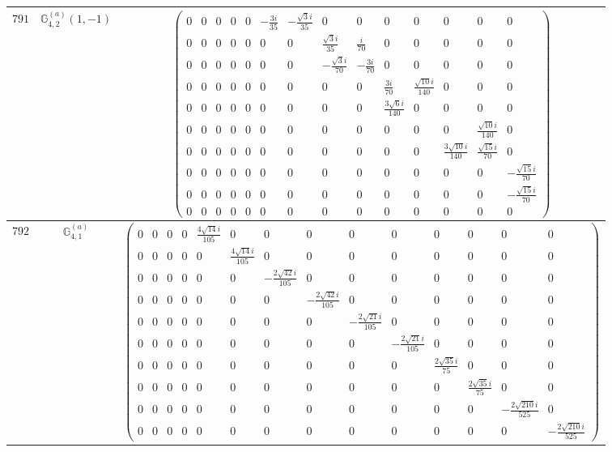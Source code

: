 \documentclass[fleqn,8pt,landscape]{jsarticle}
\begin{document}
\begin{center}
\begin{longtable}{ccc}
$ 791 $ & $ \mathbb{G}_{4,2}^{(a)}(1,-1) $ & $ \begin{pmatrix} 0 & 0 & 0 & 0 & 0 & - \frac{3 i}{35} & - \frac{\sqrt{3} i}{35} & 0 & 0 & 0 & 0 & 0 & 0 & 0 \\ 0 & 0 & 0 & 0 & 0 & 0 & 0 & \frac{\sqrt{3} i}{35} & \frac{i}{70} & 0 & 0 & 0 & 0 & 0 \\ 0 & 0 & 0 & 0 & 0 & 0 & 0 & - \frac{\sqrt{3} i}{70} & - \frac{3 i}{70} & 0 & 0 & 0 & 0 & 0 \\ 0 & 0 & 0 & 0 & 0 & 0 & 0 & 0 & 0 & \frac{3 i}{70} & \frac{\sqrt{10} i}{140} & 0 & 0 & 0 \\ 0 & 0 & 0 & 0 & 0 & 0 & 0 & 0 & 0 & \frac{3 \sqrt{6} i}{140} & 0 & 0 & 0 & 0 \\ 0 & 0 & 0 & 0 & 0 & 0 & 0 & 0 & 0 & 0 & 0 & 0 & \frac{\sqrt{10} i}{140} & 0 \\ 0 & 0 & 0 & 0 & 0 & 0 & 0 & 0 & 0 & 0 & 0 & \frac{3 \sqrt{10} i}{140} & \frac{\sqrt{15} i}{70} & 0 \\ 0 & 0 & 0 & 0 & 0 & 0 & 0 & 0 & 0 & 0 & 0 & 0 & 0 & - \frac{\sqrt{15} i}{70} \\ 0 & 0 & 0 & 0 & 0 & 0 & 0 & 0 & 0 & 0 & 0 & 0 & 0 & - \frac{\sqrt{15} i}{70} \\ 0 & 0 & 0 & 0 & 0 & 0 & 0 & 0 & 0 & 0 & 0 & 0 & 0 & 0 \end{pmatrix} $ \\ \hline
$ 792 $ & $ \mathbb{G}_{4,1}^{(a)} $ & $ \begin{pmatrix} 0 & 0 & 0 & 0 & \frac{4 \sqrt{14} i}{105} & 0 & 0 & 0 & 0 & 0 & 0 & 0 & 0 & 0 \\ 0 & 0 & 0 & 0 & 0 & \frac{4 \sqrt{14} i}{105} & 0 & 0 & 0 & 0 & 0 & 0 & 0 & 0 \\ 0 & 0 & 0 & 0 & 0 & 0 & - \frac{2 \sqrt{42} i}{105} & 0 & 0 & 0 & 0 & 0 & 0 & 0 \\ 0 & 0 & 0 & 0 & 0 & 0 & 0 & - \frac{2 \sqrt{42} i}{105} & 0 & 0 & 0 & 0 & 0 & 0 \\ 0 & 0 & 0 & 0 & 0 & 0 & 0 & 0 & - \frac{2 \sqrt{21} i}{105} & 0 & 0 & 0 & 0 & 0 \\ 0 & 0 & 0 & 0 & 0 & 0 & 0 & 0 & 0 & - \frac{2 \sqrt{21} i}{105} & 0 & 0 & 0 & 0 \\ 0 & 0 & 0 & 0 & 0 & 0 & 0 & 0 & 0 & 0 & \frac{2 \sqrt{35} i}{75} & 0 & 0 & 0 \\ 0 & 0 & 0 & 0 & 0 & 0 & 0 & 0 & 0 & 0 & 0 & \frac{2 \sqrt{35} i}{75} & 0 & 0 \\ 0 & 0 & 0 & 0 & 0 & 0 & 0 & 0 & 0 & 0 & 0 & 0 & - \frac{2 \sqrt{210} i}{525} & 0 \\ 0 & 0 & 0 & 0 & 0 & 0 & 0 & 0 & 0 & 0 & 0 & 0 & 0 & - \frac{2 \sqrt{210} i}{525} \end{pmatrix} $ \\ \hline

\end{longtable}
\end{center}
\end{document}
